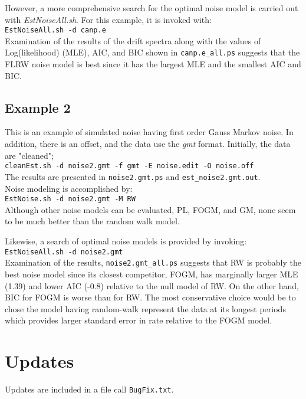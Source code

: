 \documentclass[12pt]{amsart}
\begin{document}
However, a more comprehensive search for the optimal noise model is carried out with \textit{EstNoiseAll.sh}. For this example,
it is invoked with:
\\
\texttt{EstNoiseAll.sh -d canp.e }
\\
Examination of the results of the drift spectra along with the values of Log(likelihood) (MLE), AIC, and BIC shown in
\texttt{canp.e\_all.ps} suggests that the FLRW noise model is best since it has the largest MLE and the smallest AIC and BIC.

\subsection{Example 2}

This is an example of simulated noise having first order Gauss Markov noise. In addition, there is an offset, and the
data use the \textit{gmt} format.  Initially, the data are "cleaned";
\\
\texttt{cleanEst.sh -d noise2.gmt -f gmt -E noise.edit -O noise.off}
\\
The results are presented in \texttt{noise2.gmt.ps} and \texttt{est\_noise2.gmt.out}.
\\

Noise modeling is accomplished by:
\\
\texttt{EstNoise.sh  -d noise2.gmt  -M RW}
\\
Although other noise models can be evaluated, PL, FOGM, and GM, none seem to be much better than the random walk
model.

Likewise, a search of optimal noise models is provided by invoking:
\\
\texttt{EstNoiseAll.sh  -d noise2.gmt}
\\
Examination of the results, \texttt{noise2.gmt\_all.ps} suggests that RW is probably the best noise model since
its closest competitor, FOGM, has marginally larger MLE (1.39) and lower AIC (-0.8) relative to the null model of RW.
On the other hand, BIC for FOGM is worse than for RW.  The most conservative choice would be to chose the model
having random-walk represent the data at its longest periods which provides larger standard error in rate relative to
the FOGM model.

\section{Updates}

Updates are included in a file call \texttt{BugFix.txt}.
\end{document}

